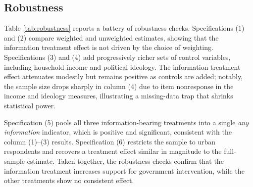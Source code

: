 \documentclass[12pt]{article}
\begin{document}
\begin{table}[h]
  \centering
  \caption{Main Results: Effect of Treatment on Support for Intervention}
  \label{tab:main}
  
\end{table}

\subsection{Robustness}

Table \ref{tab:robustness} reports a battery of robustness checks. Specifications (1) and (2) compare weighted and unweighted estimates, showing that the information treatment effect is not driven by the choice of weighting. Specifications (3) and (4) add progressively richer sets of control variables, including household income and political ideology. The information treatment effect attenuates modestly but remains positive as controls are added; notably, the sample size drops sharply in column (4) due to item nonresponse in the income and ideology measures, illustrating a missing-data trap that shrinks statistical power.

Specification (5) pools all three information-bearing treatments into a single \textit{any information} indicator, which is positive and significant, consistent with the column (1)--(3) results. Specification (6) restricts the sample to urban respondents and recovers a treatment effect similar in magnitude to the full-sample estimate. Taken together, the robustness checks confirm that the information treatment increases support for government intervention, while the other treatments show no consistent effect.



\end{document}
